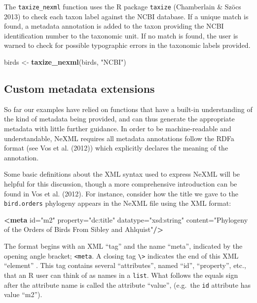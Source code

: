 \documentclass[author-year, review, 11pt]{components/elsarticle} %
\newenvironment{Shaded}{\begin{snugshade}}{\end{snugshade}}
\newcommand{\KeywordTok}[1]{\textcolor[rgb]{0.13,0.29,0.53}{\textbf{{#1}}}}
\newcommand{\StringTok}[1]{\textcolor[rgb]{0.31,0.60,0.02}{{#1}}}
\newcommand{\OtherTok}[1]{\textcolor[rgb]{0.56,0.35,0.01}{{#1}}}
\newcommand{\NormalTok}[1]{{#1}}
\begin{document}
The \texttt{taxize\_nexml} function uses the R package \texttt{taxize}
(Chamberlain \& Sz{ö}cs 2013) to check each taxon label against the NCBI
database. If a unique match is found, a metadata annotation is added to
the taxon providing the NCBI identification number to the taxonomic
unit. If no match is found, the user is warned to check for possible
typographic errors in the taxonomic labels provided.

\begin{Shaded}
\begin{Highlighting}[]
\NormalTok{birds <-}\StringTok{ }\KeywordTok{taxize_nexml}\NormalTok{(birds, }\StringTok{"NCBI"}\NormalTok{)}
\end{Highlighting}
\end{Shaded}

\subsection{Custom metadata
extensions}\label{custom-metadata-extensions}

So far our examples have relied on functions that have a built-in
understanding of the kind of metadata being provided, and can thus
generate the appropriate metadata with little further guidance. In order
to be machine-readable and understandable, NeXML requires all metadata
annotations follow the RDFa format (see Vos et al. (2012)) which
explicitly declares the meaning of the annotation.

Some basic definitions about the XML syntax used to express NeXML will
be helpful for this discussion, though a more comprehensive introduction
can be found in Vos et al. (2012). For instance, consider how the title
we gave to the \texttt{bird.orders} phylogeny appears in the NeXML file
using the XML format:

\begin{Shaded}
\begin{Highlighting}[]
\KeywordTok{<meta}\OtherTok{ id=}\StringTok{"m2"}\OtherTok{ property=}\StringTok{"dc:title"}\OtherTok{ datatype=}\StringTok{"xsd:string"}
\OtherTok{      content=}\StringTok{"Phylogeny of the Orders of Birds From Sibley and Ahlquist"}\KeywordTok{/>} 
\end{Highlighting}
\end{Shaded}

The format begins with an XML ``tag'' and the name ``meta'', indicated
by the opening angle bracket; \texttt{\textless{}meta}. A closing tag
\texttt{\textbackslash{}\textgreater{}} indicates the end of this XML
``element'' . This tag contains several ``attributes'', named ``id'',
``property'', etc., that an R user can think of as names in a
\texttt{list}. What follows the equals sign after the attribute name is
called the attribute ``value'', (e.g.~the \texttt{id} attribute has
value ``m2'').
\end{document}
